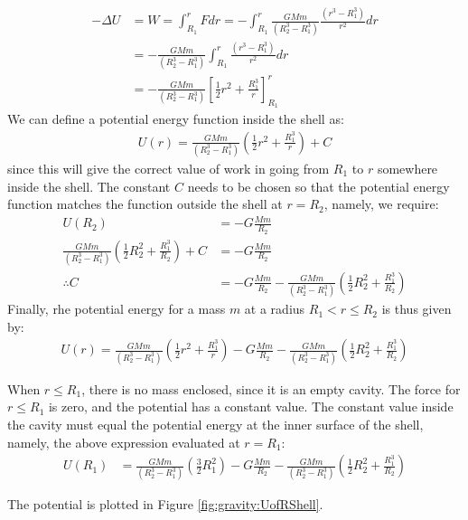 \begin{solution}
\begin{align*}
-\Delta U &=W =\int_{R_1}^{r}Fdr=-\int_{R_1}^{r}\frac{GMm}{(R_2^3-R_1^3)}\frac{(r^3-R_1^3)}{r^2}dr\\
&=-\frac{GMm}{(R_2^3-R_1^3)} \int_{R_1}^{r}\frac{(r^3-R_1^3)}{r^2}dr\\
&=-\frac{GMm}{(R_2^3-R_1^3)} \left[  \frac{1}{2}r^2+\frac{R_1^3}{r}  \right]_{R_1}^{r}
\end{align*}
We can define a potential energy function inside the shell as:
\begin{align*}
U(r) = \frac{GMm}{(R_2^3-R_1^3)} \left(  \frac{1}{2}r^2+\frac{R_1^3}{r}  \right) + C
\end{align*}
since this will give the correct value of work in going from $R_1$ to $r$ somewhere inside the shell. The constant $C$ needs to be chosen so that the potential energy function matches the function outside the shell at $r=R_2$, namely, we require:
\begin{align*}
U(R_2) &= -G\frac{Mm}{R_2} \\
\frac{GMm}{(R_2^3-R_1^3)} \left(  \frac{1}{2}R_2^2+\frac{R_1^3}{R_2}  \right) + C &= -G\frac{Mm}{R_2}\\
\therefore C&=-G\frac{Mm}{R_2}-\frac{GMm}{(R_2^3-R_1^3)} \left(  \frac{1}{2}R_2^2+\frac{R_1^3}{R_2}  \right)
\end{align*} 
Finally, rhe potential energy for a mass $m$ at a radius $R_1<r\leq R_2$ is thus given by:
\begin{align*}
U(r) = \frac{GMm}{(R_2^3-R_1^3)} \left(  \frac{1}{2}r^2+\frac{R_1^3}{r}  \right) -G\frac{Mm}{R_2}-\frac{GMm}{(R_2^3-R_1^3)} \left(  \frac{1}{2}R_2^2+\frac{R_1^3}{R_2}  \right)
\end{align*}

When $r\leq R_1$, there is no mass enclosed, since it is an empty cavity. The force for $r\leq R_1$ is zero, and the potential has a constant value. The constant value  inside the cavity must equal the potential energy at the inner surface of the shell, namely, the above expression evaluated at $r=R_1$:
\begin{align*}
U(R_1)&=\frac{GMm}{(R_2^3-R_1^3)} \left(  \frac{3}{2}R_1^2 \right) -G\frac{Mm}{R_2}-\frac{GMm}{(R_2^3-R_1^3)} \left(  \frac{1}{2}R_2^2+\frac{R_1^3}{R_2}  \right)
\end{align*}

The potential is plotted in Figure \ref{fig:gravity:UofRShell}.

\end{solution}


